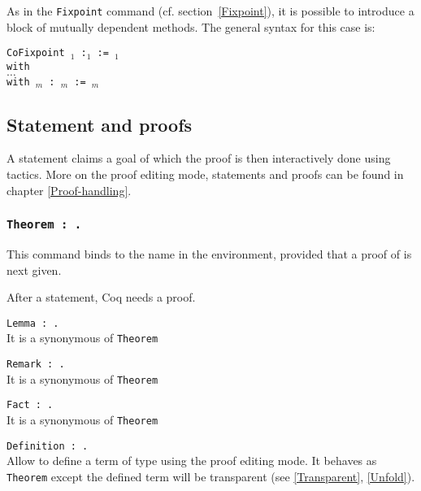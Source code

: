 As in the \texttt{Fixpoint} command (cf. section~\ref{Fixpoint}), it
is possible to introduce a block of mutually dependent methods. The
general syntax for this case is:

{\tt CoFixpoint {\ident$_1$}  :{\type$_1$} := {\term$_1$}\\
     with\\
        \mbox{}\hspace{0.1cm} $\ldots$  \\
        with {\ident$_m$}   : {\type$_m$} := {\term$_m$}}

\subsection{Statement and proofs}

A statement claims a goal of which the proof is then interactively done
using tactics. More on the proof editing mode, statements and proofs can be
found in chapter \ref{Proof-handling}.

\subsubsection{\tt Theorem {\ident} : {\type}.}
This command binds {\type} to the name {\ident} in the
environment, provided that a proof of {\type} is next given.

After a statement, Coq needs a proof.

\begin{Variants} 

\item {\tt Lemma {\ident} : {\type}.}\\ 
It is a synonymous of \texttt{Theorem}
\item {\tt Remark {\ident} : {\type}.}\\ 
It is a synonymous of \texttt{Theorem}
 \item {\tt Fact {\ident} : {\type}.}\\ 
It is a synonymous of \texttt{Theorem}
\item {\tt Definition {\ident} : {\type}.} \\
Allow to define a term of type {\type} using the proof editing mode. It
behaves as {\tt Theorem} except the defined term will be transparent (see
\ref{Transparent}, \ref{Unfold}). 
\end{Variants}

